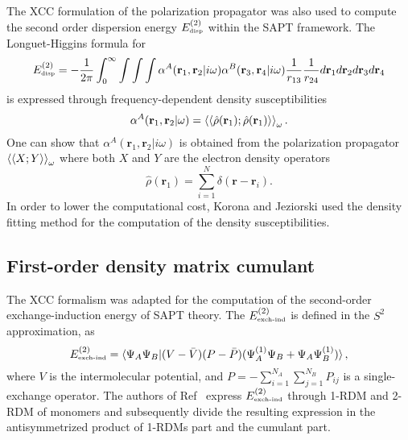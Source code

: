 \documentclass[preprint,12pt]{elsarticle}
\newcommand{\equ}[1]{\begin{equation} #1 \end{equation}}
\newcommand{\equl}[2]{\begin{equation}\label{#2} #1 \end{equation}}
\newcommand{\odp}{\braket{\braket{X;Y}}_\omega}
\newcommand{\mt}[1]{\mbox{\tiny{#1}}}
\begin{document}
The XCC formulation of the polarization propagator was also used to compute
the second order dispersion energy $E^{(2)}_{\mt{disp}}$ within the SAPT framework.\cite{korona2008dispersion}
The  Longuet-Higgins  formula for 
\equ{E^{(2)}_{\mt{disp}}  = -\frac{1}{2\pi}\int_0^\infty\int\int\int\alpha^A(\mathbf{r}_1, \mathbf{r}_2|i\omega)
  \alpha^B(\mathbf{r}_3, \mathbf{r}_4|i\omega) \frac{1}{r_{13}}\frac{1}{r_{24}}d\mathbf{r}_1d\mathbf{r}_2d\mathbf{r}_3d\mathbf{r}_4
  }
is expressed through frequency-dependent density susceptibilities
\equl{
  \alpha^A(\mathbf{r}_1, \mathbf{r}_2|\omega) = \braket{\braket{\hat{\rho}(\mathbf{r}_1);\hat{\rho}(\mathbf{r}_1)}}_\omega.
}{susc}
One can show that $\alpha^A(\mathbf{r}_1, \mathbf{r}_2|i\omega)$  is
obtained from  the polarization propagator $\odp$ where both $X$ and $Y$ are the electron density
operators
\equl{\hat{\rho}(\mathbf{r}_1) = \sum_{i=1}^N\delta(\mathbf{r}-\mathbf{r}_i).
}{dens}
In order to lower the computational cost, Korona and Jeziorski\cite{korona2008dispersion} used
the density fitting method\cite{whitten1973coulombic, dunlap1979some, kendall1997impact} for the computation
of the density susceptibilities. 

\subsection{First-order density matrix cumulant}
The XCC formalism was adapted for the computation of the second-order  exchange-induction energy of SAPT theory.\cite{korona2008second}
The $E_{\mt{exch-ind}}^{(2)}$  is defined in the $S^2$ approximation, as\cite{chalasinski1977exchange}
\equl{E_{\mt{exch-ind}}^{(2)} = \braket{\Psi_A\Psi_B|(V-\bar{V})(P-\bar{P})(\Psi^{(1)}_A\Psi_B + \Psi_A\Psi^{(1)}_B)},
  }{exch}
where $V$ is the intermolecular potential, and $P=-\sum_{i=1}^{N_A}\sum_{j=1}^{N_B}P_{ij}$ is a single-exchange operator.
  The authors of Ref~\citep{korona2008second} express $E_{\mt{exch-ind}}^{(2)}$  through 1-RDM and 2-RDM of monomers and subsequently divide the resulting expression in 
   the antisymmetrized product of 1-RDMs part and the cumulant part.
  
\end{document}
